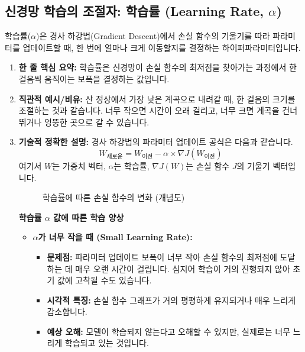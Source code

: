 \documentclass[11pt,a4paper]{book}
\theoremstyle{definition}
\begin{document}
\subsection{신경망 학습의 조절자: 학습률 (Learning Rate, $\alpha$)}
학습률($\alpha$)은 경사 하강법(Gradient Descent)에서 손실 함수의 기울기를 따라 파라미터를 업데이트할 때, 한 번에 얼마나 크게 이동할지를 결정하는 하이퍼파라미터입니다.

\begin{enumerate}
    \item \textbf{한 줄 핵심 요약:} 학습률은 신경망이 손실 함수의 최저점을 찾아가는 과정에서 한 걸음씩 움직이는 보폭을 결정하는 값입니다.
    \item \textbf{직관적 예시/비유:} 산 정상에서 가장 낮은 계곡으로 내려갈 때, 한 걸음의 크기를 조절하는 것과 같습니다. 너무 작으면 시간이 오래 걸리고, 너무 크면 계곡을 건너뛰거나 엉뚱한 곳으로 갈 수 있습니다.
    \item \textbf{기술적 정확한 설명:}
    경사 하강법의 파라미터 업데이트 공식은 다음과 같습니다.
    \begin{equation*}
    W_{\text{새로운}} = W_{\text{이전}} - \alpha \times \nabla J(W_{\text{이전}})
    \end{equation*}
    여기서 $W$는 가중치 벡터, $\alpha$는 학습률, $\nabla J(W)$는 손실 함수 $J$의 기울기 벡터입니다.

    \begin{figure}[h!]
    \centering
    \caption{학습률에 따른 손실 함수의 변화 (개념도)}
    \label{fig:learning_rate_effects}
    \end{figure}

    \textbf{학습률 $\alpha$ 값에 따른 학습 양상}
    \begin{itemize}
        \item \textbf{$\alpha$가 너무 작을 때 (Small Learning Rate):}
        \begin{itemize}
            \item \textbf{문제점:} 파라미터 업데이트 보폭이 너무 작아 손실 함수의 최저점에 도달하는 데 매우 오랜 시간이 걸립니다. 심지어 학습이 거의 진행되지 않아 초기 값에 고착될 수도 있습니다.
            \item \textbf{시각적 특징:} 손실 함수 그래프가 거의 평평하게 유지되거나 매우 느리게 감소합니다.
            \item \textbf{예상 오해:} 모델이 학습되지 않는다고 오해할 수 있지만, 실제로는 너무 느리게 학습되고 있는 것입니다.
        \end{itemize}


\end{itemize}
\end{enumerate}
\end{document}
